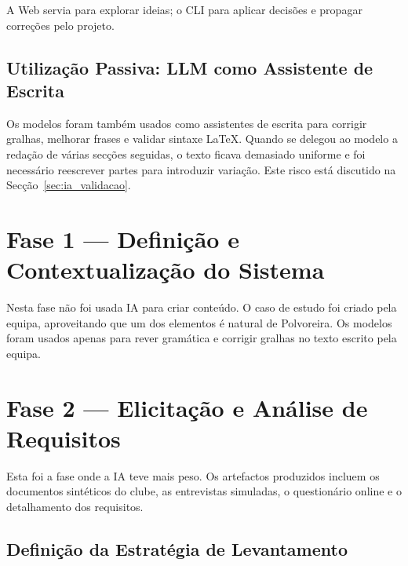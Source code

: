 A Web servia para explorar ideias; o CLI para aplicar decisões e propagar correções pelo projeto.

\subsection{Utilização Passiva: LLM como Assistente de Escrita}

Os modelos foram também usados como assistentes de escrita para corrigir gralhas, melhorar frases e validar sintaxe \LaTeX{}. Quando se delegou ao modelo a redação de várias secções seguidas, o texto ficava demasiado uniforme e foi necessário reescrever partes para introduzir variação. Este risco está discutido na Secção~\ref{sec:ia_validacao}.


\section{Fase 1 --- Definição e Contextualização do Sistema}\label{sec:ia_definicao}

Nesta fase não foi usada IA para criar conteúdo. O caso de estudo foi criado pela equipa, aproveitando que um dos elementos é natural de Polvoreira. Os modelos foram usados apenas para rever gramática e corrigir gralhas no texto escrito pela equipa.

\section{Fase 2 --- Elicitação e Análise de Requisitos}\label{sec:ia_requisitos}

Esta foi a fase onde a IA teve mais peso. Os artefactos produzidos incluem os documentos sintéticos do clube, as entrevistas simuladas, o questionário online e o detalhamento dos requisitos.

\subsection{Definição da Estratégia de Levantamento}

